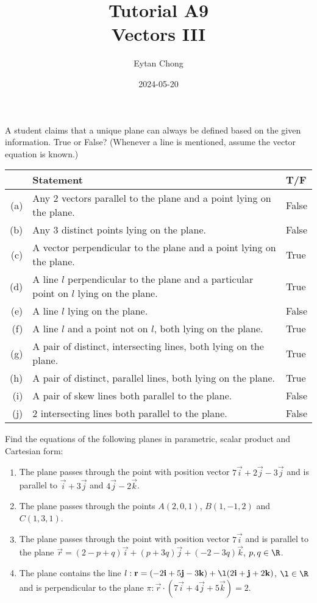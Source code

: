 \documentclass{echw}
\title{Tutorial A9\\Vectors III}
\author{Eytan Chong}
\date{2024-05-20}
\begin{document}
    \problem{}
        A student claims that a unique plane can always be defined based on the given information. True or False? (Whenever a line is mentioned, assume the vector equation is known.)

        \begin{table}[h]
            \centering
            \begin{tabularx}{\textwidth}{r X l}
            & \textbf{Statement} & \textbf{T/F}\\\hline
            (a) & Any 2 vectors parallel to the plane and a point lying on the plane. & False \\
            (b) & Any 3 distinct points lying on the plane. & False \\
            (c) & A vector perpendicular to the plane and a point lying on the plane. & True\\
            (d) & A line $l$ perpendicular to the plane and a particular point on $l$ lying on the plane. & True\\
            (e) & A line $l$ lying on the plane. & False\\
            (f) & A line $l$ and a point not on $l$, both lying on the plane. & True\\
            (g) & A pair of distinct, intersecting lines, both lying on the plane. & True\\
            (h) & A pair of distinct, parallel lines, both lying on the plane. & True\\
            (i) & A pair of skew lines both parallel to the plane. & False\\
            (j) & 2 intersecting lines both parallel to the plane. & False
            \end{tabularx}
        \end{table}

    \problem{}
        Find the equations of the following planes in parametric, scalar product and Cartesian form:

        \begin{enumerate}
            \item The plane passes through the point with position vector $7\vec i + 2 \vec j -3\vec j$ and is parallel to $\vec i + 3\vec j$ and $4\vec j - 2\vec k$.
            \item The plane passes through the points $A(2, 0, 1)$, $B(1, -1, 2)$ and $C(1, 3, 1)$.
            \item The plane passes through the point with position vector $7\vec i$ and is parallel to the plane $\vec r = (2 - p + q)\vec i + (p + 3q)\vec j + (-2-3q)\vec k$, $p, q \in \R$.
            \item The plane contains the line $l : \vec r = (-2\vec i + 5\vec j -3\vec k) + \l(2\vec i + \vec j + 2\vec k)$, $\l \in \R$ and is perpendicular to the plane $\pi : \vec r \cdot (7\vec i + 4\vec j + 5\vec k) = 2$.
        \end{enumerate}
\end{document}
